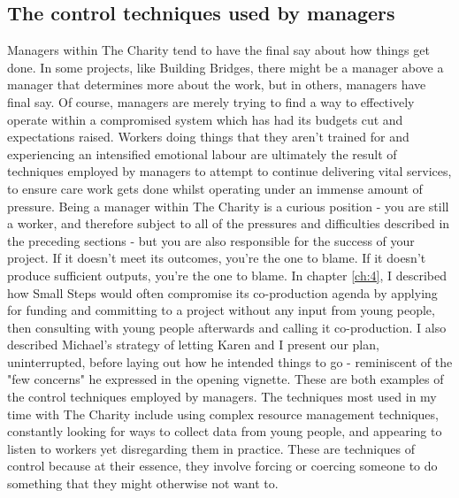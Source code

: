 \subsection{The control techniques used by managers}
Managers within The Charity tend to have the final say about how things get done. In some projects, like Building Bridges, there might be a manager above a manager that determines more about the work, but in others, managers have final say. Of course, managers are merely trying to find a way to effectively operate within a compromised system which has had its budgets cut and expectations raised. Workers doing things that they aren't trained for and experiencing an intensified emotional labour are ultimately the result of techniques employed by managers to attempt to continue delivering vital services, to ensure care work gets done whilst operating under an immense amount of pressure. Being a manager within The Charity is a curious position - you are still a worker, and therefore subject to all of the pressures and difficulties described in the preceding sections - but you are also responsible for the success of your project. If it doesn’t meet its outcomes, you’re the one to blame. If it doesn't produce sufficient outputs, you're the one to blame. In chapter \ref{ch:4}, I described how Small Steps would often compromise its co-production agenda by applying for funding and committing to a project without any input from young people, then consulting with young people afterwards and calling it co-production. I also described Michael’s strategy of letting Karen and I present our plan, uninterrupted, before laying out how he intended things to go - reminiscent of the "few concerns" he expressed in the opening vignette. These are both examples of the control techniques employed by managers. The techniques most used in my time with The Charity include using complex resource management techniques, constantly looking for ways to collect data from young people, and appearing to listen to workers yet disregarding them in practice. These are techniques of control because at their essence, they involve forcing or coercing someone to do something that they might otherwise not want to. 

